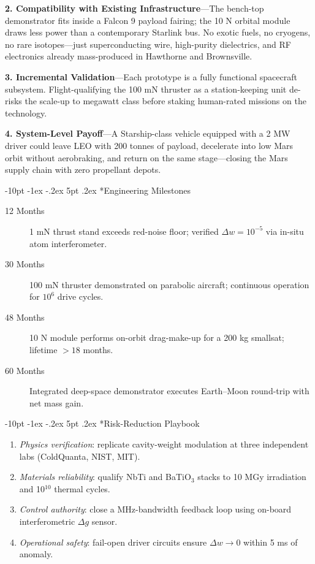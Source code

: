\documentclass[12pt,letterpaper]{book}
\makeatletter
\renewcommand\section{\@startsection {section}{1}{\z@}%
                {-10pt \@plus -1ex \@minus -.2ex}%
                {5pt \@plus.2ex}%
                {\normalfont\large\bfseries}}
\makeatother
\begin{document}
\textbf{2. Compatibility with Existing Infrastructure}\;—The bench-top demonstrator fits inside a Falcon 9 payload fairing; the 10 N orbital module draws less power than a contemporary Starlink bus.  No exotic fuels, no cryogens, no rare isotopes—just superconducting wire, high-purity dielectrics, and RF electronics already mass-produced in Hawthorne and Brownsville.

\textbf{3. Incremental Validation}\;—Each prototype is a fully functional spacecraft subsystem.  Flight-qualifying the 100 mN thruster as a station-keeping unit de-risks the scale-up to megawatt class before staking human-rated missions on the technology.

\textbf{4. System-Level Payoff}\;—A Starship-class vehicle equipped with a 2 MW driver could leave LEO with 200 tonnes of payload, decelerate into low Mars orbit without aerobraking, and return on the same stage—closing the Mars supply chain with zero propellant depots.

\section*{Engineering Milestones}
\begin{description}
  \item[12 Months] 1 mN thrust stand exceeds red-noise floor; verified $\Delta w=10^{-5}$ via in-situ atom interferometer.
  \item[30 Months] 100 mN thruster demonstrated on parabolic aircraft; continuous operation for $10^6$ drive cycles.
  \item[48 Months] 10 N module performs on-orbit drag-make-up for a 200 kg smallsat; lifetime $>18$ months.
  \item[60 Months] Integrated deep-space demonstrator executes Earth–Moon round-trip with net mass gain.
\end{description}

\section*{Risk-Reduction Playbook}
\begin{enumerate}
  \item \emph{Physics verification}: replicate cavity-weight modulation at three independent labs (ColdQuanta, NIST, MIT).
  \item \emph{Materials reliability}: qualify NbTi and BaTiO$_3$ stacks to 10 MGy irradiation and 10$^{10}$ thermal cycles.
  \item \emph{Control authority}: close a MHz-bandwidth feedback loop using on-board interferometric $\Delta g$ sensor.
  \item \emph{Operational safety}: fail-open driver circuits ensure $\Delta w\!\rightarrow\!0$ within 5 ms of anomaly.
\end{enumerate}
\end{document}
